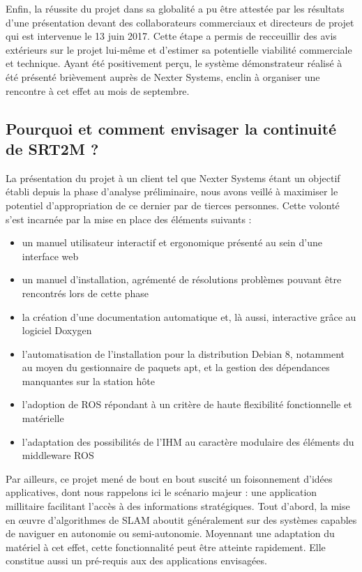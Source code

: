   Enfin, la réussite du projet dans sa globalité a pu être attestée par les résultats d'une présentation devant des collaborateurs commerciaux et directeurs de projet qui est intervenue le 13 juin 2017.
  Cette étape a permis de recceuillir des avis extérieurs sur le projet lui-même et d'estimer sa potentielle viabilité commerciale et technique. 
  Ayant été positivement perçu, le système démonstrateur réalisé à été présenté brièvement auprès de Nexter Systems, enclin à organiser une rencontre à cet effet au mois de septembre. 
  
  \subsection{Pourquoi et comment envisager la continuité de SRT2M ?}
  
  La présentation du projet à un client tel que Nexter Systems étant un objectif établi depuis la phase d'analyse préliminaire, nous avons veillé à maximiser le potentiel d'appropriation de ce dernier par de tierces personnes.
  Cette volonté s'est incarnée par la mise en place des éléments suivants : 
  
  \begin{itemize}
   \item un manuel utilisateur interactif et ergonomique présenté au sein d'une interface web
   \item un manuel d'installation, agrémenté de résolutions problèmes pouvant être rencontrés lors de cette phase
   \item la création d'une documentation automatique et, là aussi, interactive grâce au logiciel Doxygen
   \item l'automatisation de l'installation pour la distribution Debian 8, notamment au moyen du gestionnaire de paquets apt, et la gestion des dépendances manquantes sur la station hôte
   \item l'adoption de ROS répondant à un critère de haute flexibilité fonctionnelle et matérielle
   \item l'adaptation des possibilités de l'IHM au caractère modulaire des éléments du middleware ROS 
  \end{itemize}
  
  
  Par ailleurs, ce projet mené de bout en bout suscité un foisonnement d'idées applicatives, dont nous rappelons ici le scénario majeur : une application millitaire facilitant l'accès à des informations stratégiques. 
  Tout d'abord, la mise en \oe{}uvre d'algorithmes de SLAM aboutit généralement sur des systèmes capables de naviguer en autonomie ou semi-autonomie. 
  Moyennant une adaptation du matériel à cet effet, cette fonctionnalité peut être atteinte rapidement. 
  Elle constitue aussi un pré-requis aux des applications envisagées. 
  
